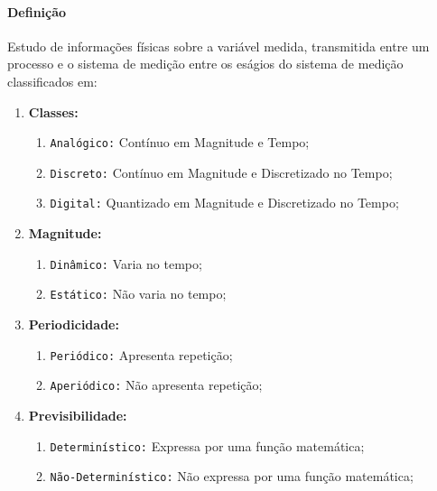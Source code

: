 \documentclass{article}
\begin{document}
        \paragraph{Definição}Estudo de informações físicas sobre a variável medida, transmitida entre um processo e o sistema de medição entre os eságios do sistema de medição classificados em:
            \begin{enumerate}
                \item \textbf{Classes:}
                    \begin{enumerate}[noitemsep, rightmargin = \leftmargin]
                        \item \texttt{Analógico:} Contínuo em Magnitude e Tempo;
                        \item \texttt{Discreto:} Contínuo em Magnitude e Discretizado no Tempo;
                        \item \texttt{Digital:} Quantizado em Magnitude e Discretizado no Tempo;
                    \end{enumerate}

                \item \textbf{Magnitude:}
                    \begin{enumerate}[noitemsep, rightmargin = \leftmargin]
                        \item \texttt{Dinâmico:} Varia no tempo;
                        \item \texttt{Estático:} Não varia no tempo;
                    \end{enumerate}

                \item \textbf{Periodicidade:}
                    \begin{enumerate}[noitemsep, rightmargin = \leftmargin]
                        \item \texttt{Periódico:} Apresenta repetição;
                        \item \texttt{Aperiódico:} Não apresenta repetição;
                    \end{enumerate}

                \item \textbf{Previsibilidade:}
                    \begin{enumerate}[noitemsep, rightmargin = \leftmargin]
                        \item \texttt{Determinístico:} Expressa por uma função matemática;
                        \item \texttt{Não-Determinístico:} Não expressa por uma função matemática;
                    \end{enumerate}
            \end{enumerate}
\end{document}
